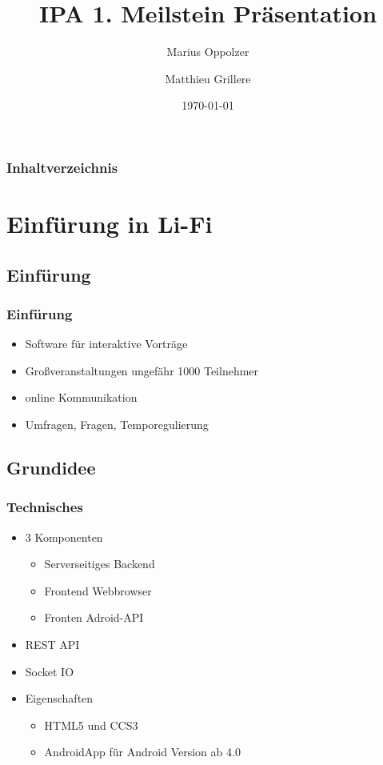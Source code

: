 \documentclass[german,a4paper]{beamer}
\title{IPA 1. Meilstein Präsentation}
\author{Marius Oppolzer \and Matthieu Grillere}
\date{\today}
\begin{document}
\maketitle{}
\begin{frame}
\frametitle{Inhaltverzeichnis}
\tableofcontents[pausesections]
\end{frame}
 
\section{Einf\"{u}rung in Li-Fi}
\subsection{Einf\"{u}rung}
\begin{frame} 
\frametitle{Einf\"{u}rung}
\begin{itemize}
  \item 
  Software für interaktive Vorträge
  \item
  Großveranstaltungen ungefähr 1000 Teilnehmer
  \item
  online Kommunikation
  \item
  Umfragen, Fragen, Temporegulierung
\end{itemize}
\end{frame}

\subsection{Grundidee}
\begin{frame} 
\frametitle{Technisches}
\begin{itemize}
  \item 
  3 Komponenten
  \begin{itemize}
    \item
    Serverseitiges Backend
    \item
    Frontend Webbrowser
    \item
    Fronten Adroid-API
  \end{itemize}
  \item 
  REST API
  \item
  Socket IO
  \item
  Eigenschaften
  \begin{itemize}
    \item
    HTML5 und CCS3
    \item
    AndroidApp für Android Version ab 4.0
  \end{itemize}
\end{itemize}
\end{frame}
\end{document}
